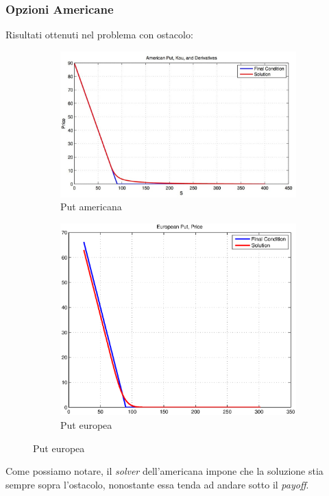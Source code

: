 \documentclass{beamer}
\begin{document}
\begin{frame}
\frametitle{Opzioni Americane}
Risultati ottenuti nel problema con ostacolo:
\begin{figure}
\begin{subfigure}{0.48\linewidth}
\centering
 \includegraphics[width=.9\linewidth]{img/us_put.jpg}
 \caption{Put americana}
 \end{subfigure}
 \hfill
 \begin{subfigure}{0.48\linewidth}
  \centering
  \includegraphics[width=0.9\linewidth]{test1-put1dprice.eps}
  \caption{Put europea}
 \end{subfigure}
 \end{figure}
 Come possiamo notare, il \emph{solver} dell'americana impone che la soluzione stia sempre sopra l'ostacolo, nonostante essa tenda ad andare sotto il \emph{payoff}.
\end{frame}
\end{document}
